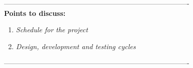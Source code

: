 
-------------------------------------------------------------------------------\\
\textbf{Points to discuss:}
\begin{enumerate}
	\item{\textit{Schedule for the project}}
	\item{\textit{Design, development and testing cycles}}
\end{enumerate}
-------------------------------------------------------------------------------\\
